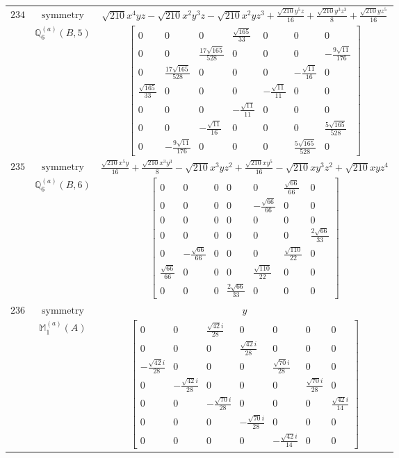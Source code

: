 \documentclass[fleqn,8pt,landscape]{jsarticle}
\begin{document}
\begin{longtable}{ccc}
$ 234 $ & $ \text{symmetry} $ & $ \sqrt{210} x^{4} y z - \sqrt{210} x^{2} y^{3} z - \sqrt{210} x^{2} y z^{3} + \frac{\sqrt{210} y^{5} z}{16} + \frac{\sqrt{210} y^{3} z^{3}}{8} + \frac{\sqrt{210} y z^{5}}{16} $ \\
$  $ & $ \mathbb{Q}_{6}^{(a)}(B,5) $ & $ \begin{bmatrix} 0 & 0 & 0 & \frac{\sqrt{165}}{33} & 0 & 0 & 0 \\ 0 & 0 & \frac{17 \sqrt{165}}{528} & 0 & 0 & 0 & - \frac{9 \sqrt{11}}{176} \\ 0 & \frac{17 \sqrt{165}}{528} & 0 & 0 & 0 & - \frac{\sqrt{11}}{16} & 0 \\ \frac{\sqrt{165}}{33} & 0 & 0 & 0 & - \frac{\sqrt{11}}{11} & 0 & 0 \\ 0 & 0 & 0 & - \frac{\sqrt{11}}{11} & 0 & 0 & 0 \\ 0 & 0 & - \frac{\sqrt{11}}{16} & 0 & 0 & 0 & \frac{5 \sqrt{165}}{528} \\ 0 & - \frac{9 \sqrt{11}}{176} & 0 & 0 & 0 & \frac{5 \sqrt{165}}{528} & 0 \end{bmatrix} $ \\ \hline
$ 235 $ & $ \text{symmetry} $ & $ \frac{\sqrt{210} x^{5} y}{16} + \frac{\sqrt{210} x^{3} y^{3}}{8} - \sqrt{210} x^{3} y z^{2} + \frac{\sqrt{210} x y^{5}}{16} - \sqrt{210} x y^{3} z^{2} + \sqrt{210} x y z^{4} $ \\
$  $ & $ \mathbb{Q}_{6}^{(a)}(B,6) $ & $ \begin{bmatrix} 0 & 0 & 0 & 0 & 0 & \frac{\sqrt{66}}{66} & 0 \\ 0 & 0 & 0 & 0 & - \frac{\sqrt{66}}{66} & 0 & 0 \\ 0 & 0 & 0 & 0 & 0 & 0 & 0 \\ 0 & 0 & 0 & 0 & 0 & 0 & \frac{2 \sqrt{66}}{33} \\ 0 & - \frac{\sqrt{66}}{66} & 0 & 0 & 0 & \frac{\sqrt{110}}{22} & 0 \\ \frac{\sqrt{66}}{66} & 0 & 0 & 0 & \frac{\sqrt{110}}{22} & 0 & 0 \\ 0 & 0 & 0 & \frac{2 \sqrt{66}}{33} & 0 & 0 & 0 \end{bmatrix} $ \\ \hline
$ 236 $ & $ \text{symmetry} $ & $ y $ \\
$  $ & $ \mathbb{M}_{1}^{(a)}(A) $ & $ \begin{bmatrix} 0 & 0 & \frac{\sqrt{42} i}{28} & 0 & 0 & 0 & 0 \\ 0 & 0 & 0 & \frac{\sqrt{42} i}{28} & 0 & 0 & 0 \\ - \frac{\sqrt{42} i}{28} & 0 & 0 & 0 & \frac{\sqrt{70} i}{28} & 0 & 0 \\ 0 & - \frac{\sqrt{42} i}{28} & 0 & 0 & 0 & \frac{\sqrt{70} i}{28} & 0 \\ 0 & 0 & - \frac{\sqrt{70} i}{28} & 0 & 0 & 0 & \frac{\sqrt{42} i}{14} \\ 0 & 0 & 0 & - \frac{\sqrt{70} i}{28} & 0 & 0 & 0 \\ 0 & 0 & 0 & 0 & - \frac{\sqrt{42} i}{14} & 0 & 0 \end{bmatrix} $ \\ \hline

\end{longtable}
\end{document}
